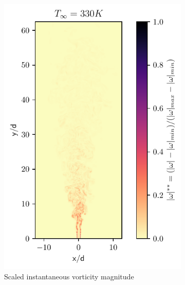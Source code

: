 \begin{figure}[htbp!]
\begin{subfigure}{0.25\textwidth}
	\centering
	\includegraphics[scale=.65]{figures/Plots/vertical/330/magvort_scaled_vert_330.pdf}
	\caption{Scaled instantaneous vorticity magnitude} \label{330_magvort_1}
\end{subfigure}
\hfill
\begin{subfigure}{0.25\textwidth}
	\centering

\end{subfigure}
\end{figure}
